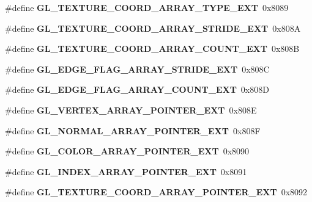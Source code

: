 \begin{DoxyCompactItemize}
\item 
\#define {\bfseries G\+L\+\_\+\+T\+E\+X\+T\+U\+R\+E\+\_\+\+C\+O\+O\+R\+D\+\_\+\+A\+R\+R\+A\+Y\+\_\+\+T\+Y\+P\+E\+\_\+\+E\+X\+T}~0x8089\label{_s_d_l__opengl_8h_acf558f75c3579b0cb8f0dec4d9af90dd}

\item 
\#define {\bfseries G\+L\+\_\+\+T\+E\+X\+T\+U\+R\+E\+\_\+\+C\+O\+O\+R\+D\+\_\+\+A\+R\+R\+A\+Y\+\_\+\+S\+T\+R\+I\+D\+E\+\_\+\+E\+X\+T}~0x808\+A\label{_s_d_l__opengl_8h_a3010197af61d4336855ea9bad35dd953}

\item 
\#define {\bfseries G\+L\+\_\+\+T\+E\+X\+T\+U\+R\+E\+\_\+\+C\+O\+O\+R\+D\+\_\+\+A\+R\+R\+A\+Y\+\_\+\+C\+O\+U\+N\+T\+\_\+\+E\+X\+T}~0x808\+B\label{_s_d_l__opengl_8h_a8904b2150293bc2d7932054da6323a75}

\item 
\#define {\bfseries G\+L\+\_\+\+E\+D\+G\+E\+\_\+\+F\+L\+A\+G\+\_\+\+A\+R\+R\+A\+Y\+\_\+\+S\+T\+R\+I\+D\+E\+\_\+\+E\+X\+T}~0x808\+C\label{_s_d_l__opengl_8h_a0c94b362c3f8b77f12913aff80b90d51}

\item 
\#define {\bfseries G\+L\+\_\+\+E\+D\+G\+E\+\_\+\+F\+L\+A\+G\+\_\+\+A\+R\+R\+A\+Y\+\_\+\+C\+O\+U\+N\+T\+\_\+\+E\+X\+T}~0x808\+D\label{_s_d_l__opengl_8h_a020cc424168bf0aead42d056973f5c0c}

\item 
\#define {\bfseries G\+L\+\_\+\+V\+E\+R\+T\+E\+X\+\_\+\+A\+R\+R\+A\+Y\+\_\+\+P\+O\+I\+N\+T\+E\+R\+\_\+\+E\+X\+T}~0x808\+E\label{_s_d_l__opengl_8h_a7ad97bd4f0711821bc06a7661c9e2902}

\item 
\#define {\bfseries G\+L\+\_\+\+N\+O\+R\+M\+A\+L\+\_\+\+A\+R\+R\+A\+Y\+\_\+\+P\+O\+I\+N\+T\+E\+R\+\_\+\+E\+X\+T}~0x808\+F\label{_s_d_l__opengl_8h_a5296d3bfe6072e7e03da47231d2bc474}

\item 
\#define {\bfseries G\+L\+\_\+\+C\+O\+L\+O\+R\+\_\+\+A\+R\+R\+A\+Y\+\_\+\+P\+O\+I\+N\+T\+E\+R\+\_\+\+E\+X\+T}~0x8090\label{_s_d_l__opengl_8h_a312e8d1ce91a7c55157b545ee0b47d2a}

\item 
\#define {\bfseries G\+L\+\_\+\+I\+N\+D\+E\+X\+\_\+\+A\+R\+R\+A\+Y\+\_\+\+P\+O\+I\+N\+T\+E\+R\+\_\+\+E\+X\+T}~0x8091\label{_s_d_l__opengl_8h_aacf4bfb78c546c6e1536ddc82ab0207e}

\item 
\#define {\bfseries G\+L\+\_\+\+T\+E\+X\+T\+U\+R\+E\+\_\+\+C\+O\+O\+R\+D\+\_\+\+A\+R\+R\+A\+Y\+\_\+\+P\+O\+I\+N\+T\+E\+R\+\_\+\+E\+X\+T}~0x8092\label{_s_d_l__opengl_8h_a7269c0fdd29b47570503a3b3dddb0408}


\end{DoxyCompactItemize}
